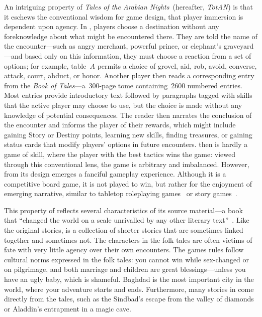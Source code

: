 \documentclass[a4paper]{article}
\begin{document}
An intriguing property of \textit{Tales of the Arabian Nights}~(hereafter, \textit{TotAN}) is that it eschews the conventional wisdom for game design,
that player immersion is dependent upon agency.
In \totan{}, 
players choose a destination without any foreknowledge about
what might be encountered there.
They are told the name of the
encounter---such as angry merchant,  powerful prince, or
elephant's graveyard---and based only on this information,
they must choose a reaction from a set of options; for example, 
table~$A$ permits a choice of grovel, aid, rob, avoid, converse,
attack, court, abduct, or honor.
Another player then reads a corresponding entry from 
the \textit{Book of Tales}---a~300-page tome containing~2600 numbered entries.
Most entries provide introductory text followed by paragraphs
tagged with skills that the active player may choose to use, but the choice
is made without any knowledge of potential consequences.
The reader then narrates the conclusion of the
encounter and informs the player of their rewards, which might include
gaining Story or Destiny points, learning new skills, finding treasures, or
gaining status cards that modify players' options in future encounters.
\totan{} then is hardly a game of skill, where the player with the best tactics
wins the game: viewed through this conventional lens, the game is arbitrary
and imbalanced. However, from its design emerges a fanciful gameplay
experience.
Although it is a competitive board game, 
it is not played to win,
but rather for the enjoyment of emerging narrative,
similar to tabletop roleplaying games~\citep{Grouling2001}
or story games~\citep{Duncan2015}.

This property of \totan{} reflects several characteristics
of its source material---a book that ``changed the world on a scale
unrivalled by any other literary text''~\citep[p.1]{Makdisi2008}.
Like the original stories, \totan{} is a collection of shorter stories
that are sometimes linked together and sometimes not.
The characters in the folk tales are often victims of fate with
very little agency over their own encounters. The games rules follow
cultural norms expressed in the folk tales:
you cannot win while sex-changed or on pilgrimage, and both marriage
and children are great blessings---unless you have an ugly baby,
which is shameful.
Baghdad is the most important city in the world, where your adventure starts
and ends.
Furthermore, many stories in \totan{} come directly from the tales,
such as the Sindbad's escape from the valley of diamonds or Aladdin's
entrapment in a magic cave. 
\end{document}
